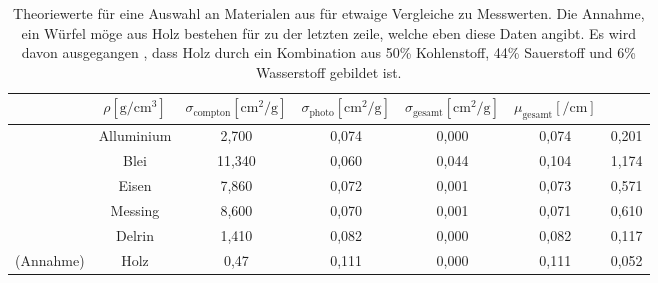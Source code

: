 \begin{table}
    \centering
    \caption{Theoriewerte für eine Auswahl an Materialen aus \cite{...} für etwaige Vergleiche zu Messwerten.
            Die Annahme, ein Würfel möge aus Holz bestehen für zu der letzten zeile, welche eben diese Daten angibt. Es wird davon ausgegangen \cite{holz}, dass
            Holz durch ein Kombination aus 50\% Kohlenstoff, 44\% Sauerstoff und 6\% Wasserstoff gebildet ist. } 
    \label{tab:1}
    \begin{tabular}{c c c c c c c}
    \toprule
    ~ & $\rho [\si{\gram\per\centi\meter^3}]$ & $\sigma_{\text{compton}} [\si{\centi\meter^2\per\gram}] $ & $\sigma_{\text{photo}} [\si{\centi\meter^2\per\gram}] $  & $\sigma_{\text{gesamt}} [\si{\centi\meter^2\per\gram}]$ &  $\mu_{\text{gesamt}}[\si{\per\centi\meter}]$ \\
    \midrule
    ~ &Alluminium  &2,700 & 0,074   & 0,000 & 0,074 &  0,201 \\        
    ~ &Blei        &11,340& 0,060   & 0,044 & 0,104 &  1,174 \\    
    ~ &Eisen       &7,860 & 0,072   & 0,001 & 0,073 &  0,571 \\    
    ~ &Messing     &8,600 & 0,070   & 0,001 & 0,071 &  0,610 \\    
    ~ &Delrin      &1,410 & 0,082   & 0,000 & 0,082 &  0,117 \\    
    (Annahme) & Holz &  0,47 & 0,111  & 0,000 & 0,111 & 0,052 \\
\end{tabular}
\end{table}



